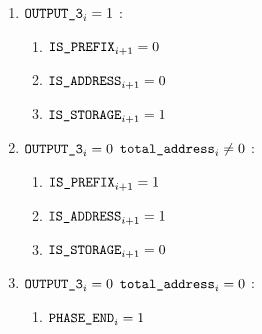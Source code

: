 \begin{enumerate}[resume]
\begin{enumerate}[resume]
\begin{enumerate}
					\item \If $\texttt{OUTPUT\_3}_{i} = 1$ \Then:
						\begin{enumerate}
							\item $\texttt{IS\_PREFIX} _{i+1} = 0$
							\item $\texttt{IS\_ADDRESS}   _{i+1} = 0$
							\item $\texttt{IS\_STORAGE}    _{i+1} = 1$
						\end{enumerate}

					\item \If $\texttt{OUTPUT\_3}_{i} = 0$ \et $\texttt{total\_address}_{i} \neq 0$ \Then:
						\begin{enumerate}
							\item $\texttt{IS\_PREFIX} _{i+1} = 1$
							\item $\texttt{IS\_ADDRESS}   _{i+1} = 1$
							\item $\texttt{IS\_STORAGE}    _{i+1} = 0$
						\end{enumerate}

					\item \If $\texttt{OUTPUT\_3}_{i} = 0$ \et $\texttt{total\_address}_{i} = 0$ \Then:
						\begin{enumerate}
							\item $\texttt{PHASE\_END} _{i} = 1$
						\end{enumerate}
				\end{enumerate}			
		\end{enumerate}


\end{enumerate}
